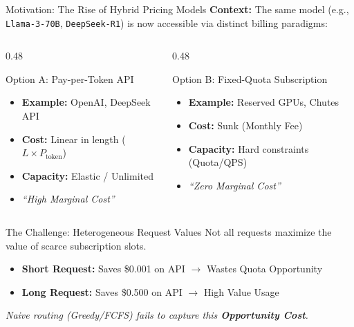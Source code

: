 \documentclass[aspectratio=169,10pt]{beamer}
\begin{document}
\begin{frame}{Motivation: The Rise of Hybrid Pricing Models}
    \textbf{Context:} The same model (e.g., \texttt{Llama-3-70B}, \texttt{DeepSeek-R1}) is now accessible via distinct billing paradigms:

    \vspace{0.3cm}

    \begin{columns}[T]
        \begin{column}{0.48\textwidth}
            \begin{block}{Option A: Pay-per-Token API}
                \begin{itemize}
                    \item \textbf{Example:} OpenAI, DeepSeek API
                    \item \textbf{Cost:} Linear in length ($L \times P_{\text{token}}$)
                    \item \textbf{Capacity:} Elastic / Unlimited
                    \item \textit{``High Marginal Cost''}
                \end{itemize}
            \end{block}
        \end{column}

        \begin{column}{0.48\textwidth}
            \begin{block}{Option B: Fixed-Quota Subscription}
                \begin{itemize}
                    \item \textbf{Example:} Reserved GPUs, Chutes
                    \item \textbf{Cost:} Sunk (Monthly Fee)
                    \item \textbf{Capacity:} Hard constraints (Quota/QPS)
                    \item \textit{``Zero Marginal Cost''}
                \end{itemize}
            \end{block}
        \end{column}
    \end{columns}

    \vspace{0.4cm}

    \begin{alertblock}{The Challenge: Heterogeneous Request Values}
        Not all requests maximize the value of scarce subscription slots.
        \begin{itemize}
            \item \textbf{Short Request:} Saves \$0.001 on API $\to$ \textcolor{icmlred}{Wastes Quota Opportunity}
            \item \textbf{Long Request:} Saves \$0.500 on API $\to$ \textcolor{icmlgreen}{High Value Usage}
        \end{itemize}
        \centering
        \textit{Naive routing (Greedy/FCFS) fails to capture this \textbf{Opportunity Cost}.}
    \end{alertblock}


\end{frame}
\end{document}
